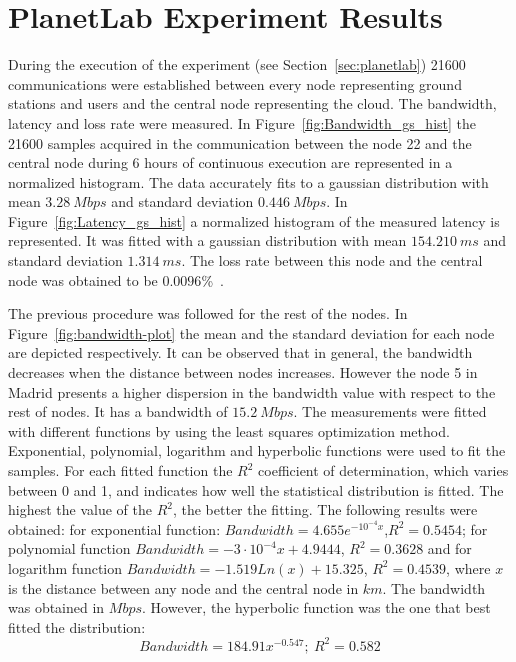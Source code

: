 
\section{PlanetLab Experiment Results}
\label{sec:pl-res}
During the execution of the \pl experiment (see Section~\ref{sec:planetlab}) 21600 communications were established between every node representing ground stations and users and the central node representing the cloud. The bandwidth, latency and loss rate were measured.
In Figure~\ref{fig:Bandwidth_gs_hist} the 21600 samples acquired in the communication between the node 22 and the central node during 6 hours of continuous execution are represented in a normalized histogram. The data accurately fits to a gaussian distribution with mean $3.28~Mbps$ and standard deviation $0.446~Mbps$. In Figure~\ref{fig:Latency_gs_hist} a normalized histogram of the measured latency is represented. It was fitted with a gaussian distribution with mean $154.210~ms$ and standard deviation $1.314~ms$. The loss rate between this node and the central node was obtained to be $0.0096$\%~\cite{Gonzalez2014}.
\begin{figure*}
\begin{center}
\hspace{0.01\textwidth}
\end{center}
\end{figure*}



The previous procedure was followed for the rest of the nodes. In
Figure~\ref{fig:bandwidth-plot} the mean and the standard deviation for each
node are depicted respectively. It can be observed that in general, the
bandwidth decreases when the distance between nodes increases. However the node
5 in Madrid presents a higher dispersion in the bandwidth value with respect to
the rest of nodes. It has a bandwidth of $15.2~Mbps$. The measurements were
fitted with different functions by using the least squares optimization
method. Exponential, polynomial, logarithm and hyperbolic functions were used to
fit the samples. For each fitted function the $R^2$ coefficient of
determination, which varies between 0 and 1, and indicates how well the
statistical distribution is fitted. The highest the value of the $R^2$, the
better the fitting. The following results were obtained: for exponential
function: $Bandwidth=4.655e^{-10^{-4}x}$,$R^2=0.5454$; for polynomial function
$Bandwidth=-3\cdot10^{-4}x+4.9444$, $R^2=0.3628$ and for logarithm function $Bandwidth=-1.519Ln(x)+15.325$, $R^2=0.4539$, where $x$ is the distance between any node and the central node in $km$. The bandwidth was obtained in $Mbps$. However, the hyperbolic function was the one that best fitted the distribution:
\begin{equation}\label{eq:bandwidth_fitting}
Bandwidth=184.91x^{-0.547};~R^2=0.582
\end{equation}

